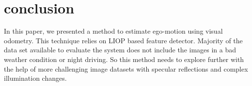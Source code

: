 \documentclass{article}
\begin{document}
\section{conclusion}
 In this paper, we presented a method to estimate ego-motion using visual odometry. This technique relies on  LIOP based feature detector.
Majority of the data set available to evaluate the system does not include the images in a bad weather condition or night driving. So this method needs to explore further with the help of more challenging image datasets with specular reflections and complex illumination changes. 



\end{document}
